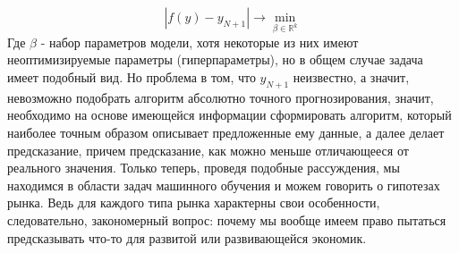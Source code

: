 		\begin{equation}
			|f(y) - y_{N + 1}| \to \min_{\beta \in \mathbb{R}^k}
		\end{equation}
		Где $\beta$ - набор параметров модели, хотя некоторые из них имеют неоптимизируемые параметры (гиперпараметры), но в общем случае задача имеет подобный вид. Но проблема в том, что $y_{N + 1}$ неизвестно, а значит, невозможно подобрать алгоритм абсолютно точного прогнозирования, значит, необходимо на основе имеющейся информации сформировать алгоритм, который наиболее точным образом описывает предложенные ему данные, а далее делает предсказание, причем предсказание, как можно меньше отличающееся от реального значения. Только теперь, проведя подобные рассуждения, мы находимся в области задач машинного обучения и можем говорить о гипотезах рынка. Ведь для каждого типа рынка характерны свои особенности, следовательно, закономерный вопрос: почему мы вообще имеем право пытаться предсказывать что-то для развитой или развивающейся экономик.
